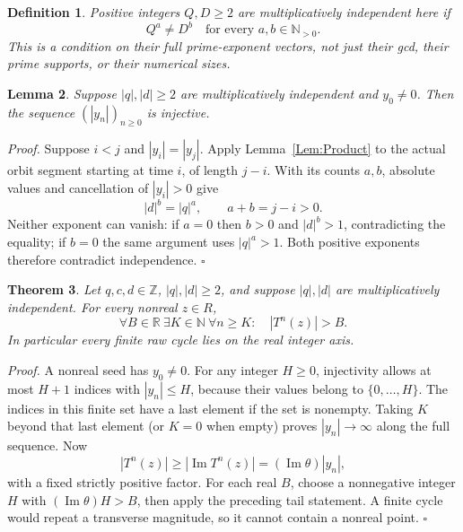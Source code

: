 \documentclass[11pt,letterpaper]{article}
\newcommand{\N}{\mathbb{N}}
\newcommand{\Z}{\mathbb{Z}}
\newcommand{\R}{\mathbb{R}}
\newtheorem{theorem}{Theorem}
\newtheorem{lemma}[theorem]{Lemma}
\newtheorem{definition}[theorem]{Definition}
\newenvironment{proof}{\noindent\textit{Proof.}}{\hfill\(\square\)}
\begin{document}
\begin{definition}\label{Def:Independent}
Positive integers \(Q,D\ge2\) are multiplicatively independent here if
\[
Q^a\ne D^b\quad\text{for every }a,b\in\N_{>0}.
\]
This is a condition on their full prime-exponent vectors, not just their
gcd, their prime supports, or their numerical sizes.
\end{definition}

\begin{lemma}\label{Lem:Injective}
Suppose \(|q|,|d|\ge2\) are multiplicatively independent and \(y_0\ne0\).
Then the sequence \((|y_n|)_{n\ge0}\) is injective.
\end{lemma}
\begin{proof}
Suppose \(i<j\) and \(|y_i|=|y_j|\). Apply Lemma~\ref{Lem:Product}
to the actual orbit segment starting at time \(i\), of length \(j-i\).
With its counts \(a,b\), absolute values and cancellation of
\(|y_i|>0\) give
\[
|d|^b=|q|^a,\qquad a+b=j-i>0.
\]
Neither exponent can vanish: if \(a=0\) then \(b>0\) and \(|d|^b>1\),
contradicting the equality; if \(b=0\) the same argument uses \(|q|^a>1\).
Both positive exponents therefore contradict independence.
\end{proof}

\begin{theorem}\label{Thm:Escape}
Let \(q,c,d\in\Z\), \(|q|,|d|\ge2\), and suppose \(|q|,|d|\) are
multiplicatively independent. For every nonreal \(z\in R\),
\[
\forall B\in\R\ \exists K\in\N\ \forall n\ge K:\quad |T^n(z)|>B.
\]
In particular every finite raw cycle lies on the real integer axis.
\end{theorem}
\begin{proof}
A nonreal seed has \(y_0\ne0\). For any integer \(H\ge0\), injectivity
allows at most \(H+1\) indices with \(|y_n|\le H\), because their values
belong to \(\{0,\ldots,H\}\). The indices in this finite set have a last
element if the set is nonempty. Taking \(K\) beyond that last element
(or \(K=0\) when empty) proves \(|y_n|\to\infty\) along the full sequence.
Now
\[
|T^n(z)|\ge|\operatorname{Im}T^n(z)|
=(\operatorname{Im}\theta)|y_n|,
\]
with a fixed strictly positive factor. For each real \(B\), choose a
nonnegative integer \(H\) with \((\operatorname{Im}\theta)H>B\), then
apply the preceding tail statement. A finite cycle would repeat a
transverse magnitude, so it cannot contain a nonreal point.
\end{proof}
\end{document}
